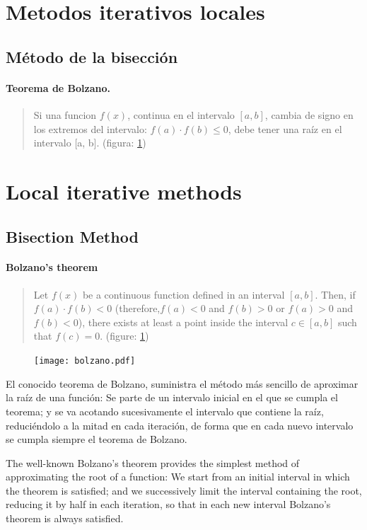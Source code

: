 \begin{paracol}{2}
\section{Metodos iterativos locales}
\subsection{Método de la bisección}
\paragraph*{Teorema de Bolzano.}
\begin{quote}
Si una funcion $f(x)$, continua en el intervalo $[a, b]$, cambia de signo en los extremos del intervalo: $f(a)\cdot f(b) \le 0$, debe tener una raíz en el intervalo [a, b]. (figura: \ref{fig:bolzano}) 
\end{quote}

\switchcolumn
\section{Local iterative methods}
\subsection{Bisection Method}
\paragraph*{Bolzano's theorem}
\begin{quote}
    Let $f(x)$ be a continuous function defined in an interval $[a, b]$. Then, if $f(a)\cdot f(b)<0$
(therefore,$f(a)<0$ and $f(b)>0$ or $f(a)>0$ and $f(b)<0$), there exists at least a point inside the interval $c \in [a,b]$ such that $f(c)=0$. (figure: \ref{fig:bolzano})
\end{quote}
\end{paracol}

\begin{figure}[h]
\centering
\texttt{[image: bolzano.pdf]}
\label{fig:bolzano}
\end{figure}

\begin{paracol}{2}

El conocido teorema de Bolzano, suministra el método más sencillo de aproximar la raíz de una función: Se parte de un intervalo inicial en el que se cumpla el teorema; y se va acotando sucesivamente el intervalo que contiene la raíz, reduciéndolo a la mitad en cada iteración, de forma que en cada nuevo intervalo se cumpla siempre el teorema de Bolzano.
\switchcolumn

The well-known Bolzano's theorem provides the simplest method of approximating the root of a function: We start from an initial interval in which the theorem is satisfied; and we successively limit the interval containing the root, reducing it by half in each iteration, so that in each new interval Bolzano's theorem is always satisfied.

\end{paracol}

